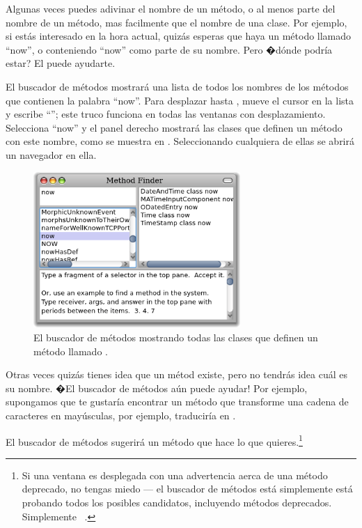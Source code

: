 \documentclass[a4paper,10pt,twoside]{book}
\begin{document}
Algunas veces puedes adivinar el nombre de un m\'etodo, o al menos parte del nombre de un m\'etodo, mas facilmente que el nombre de una clase. Por ejemplo, si est\'as interesado en la hora actual, quiz\'as esperas que haya un m\'etodo llamado ``now'', o conteniendo ``now'' como parte de su nombre. Pero �d\'onde podr\'ia estar?
El  puede ayudarte.

El buscador de m\'etodos mostrar\'a una lista de todos los nombres de los m\'etodos que contienen la palabra ``now''.
Para desplazar hasta , mueve el cursor en la lista y escribe ``''; este truco funciona en todas las ventanas con desplazamiento. Selecciona ``now'' y el panel derecho mostrar\'a las clases que definen un m\'etodo con este nombre, como se muestra en . Seleccionando cualquiera de ellas se abrir\'a un navegador en ella.

\begin{figure}[hbt]
\centerline {\includegraphics[width=0.7\textwidth]{methodFinder-now}}
\caption{El buscador de m\'etodos mostrando todas las clases que definen un m\'etodo llamado .
}
\end{figure}

Otras veces quiz\'as tienes idea que un m\'etod existe, pero no tendr\'as idea cu\'al es su nombre.
�El buscador de m\'etodos a\'un puede ayudar! Por ejemplo, supongamos que te gustar\'ia encontrar un m\'etodo que transforme una cadena de caracteres en may\'usculas, por ejemplo, traducir\'ia  en .

\noindent
El buscador de m\'etodos sugerir\'a un m\'etodo que hace lo que quieres.\footnote{Si una ventana es desplegada con una advertencia aerca de una m\'etodo deprecado, no tengas miedo --- el buscador de m\'etodos est\'a simplemente est\'a probando todos los posibles candidatos, incluyendo m\'etodos deprecados. Simplemente \click ~.}
\end{document}
